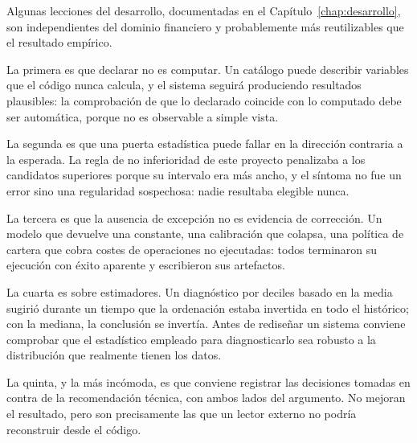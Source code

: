 Algunas lecciones del desarrollo, documentadas en el Capítulo~\ref{chap:desarrollo}, son
independientes del dominio financiero y probablemente más reutilizables que el resultado empírico.

La primera es que declarar no es computar. Un catálogo puede describir variables que el código nunca
calcula, y el sistema seguirá produciendo resultados plausibles: la comprobación de que lo declarado
coincide con lo computado debe ser automática, porque no es observable a simple vista.

La segunda es que una puerta estadística puede fallar en la dirección contraria a la esperada. La
regla de no inferioridad de este proyecto penalizaba a los candidatos superiores porque su intervalo
era más ancho, y el síntoma no fue un error sino una regularidad sospechosa: nadie resultaba
elegible nunca.

La tercera es que la ausencia de excepción no es evidencia de corrección. Un modelo que devuelve una
constante, una calibración que colapsa, una política de cartera que cobra costes de operaciones no
ejecutadas: todos terminaron su ejecución con éxito aparente y escribieron sus artefactos.

La cuarta es sobre estimadores. Un diagnóstico por deciles basado en la media sugirió durante un
tiempo que la ordenación estaba invertida en todo el histórico; con la mediana, la conclusión se
invertía. Antes de rediseñar un sistema conviene comprobar que el estadístico empleado para
diagnosticarlo sea robusto a la distribución que realmente tienen los datos.

La quinta, y la más incómoda, es que conviene registrar las decisiones tomadas en contra de la
recomendación técnica, con ambos lados del argumento. No mejoran el resultado, pero son
precisamente las que un lector externo no podría reconstruir desde el código.
